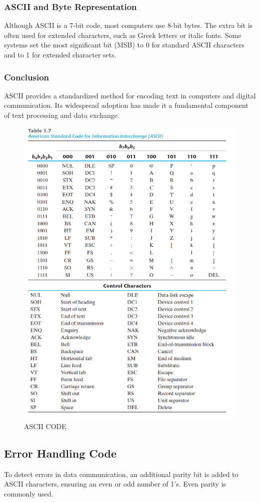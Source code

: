 \documentclass[a4paper,12pt]{article}
\begin{document}
\subsubsection{ASCII and Byte Representation}
Although ASCII is a 7-bit code, most computers use 8-bit bytes. The extra bit is often used for extended characters, such as Greek letters or italic fonts. Some systems set the most significant bit (MSB) to 0 for standard ASCII characters and to 1 for extended character sets.

\subsubsection{Conclusion}
ASCII provides a standardized method for encoding text in computers and digital communication. Its widespread adoption has made it a fundamental component of text processing and data exchange.
\begin{figure}
    \centering
    \includegraphics[width=0.8\linewidth]{1.png}
    \caption{ASCII CODE}
    \label{fig:enter-label}
\end{figure}
\subsection{Error Handling Code}
To detect errors in data communication, an additional parity bit is added to ASCII characters, ensuring an even or odd number of 1’s. Even parity is commonly used. 
\end{document}
